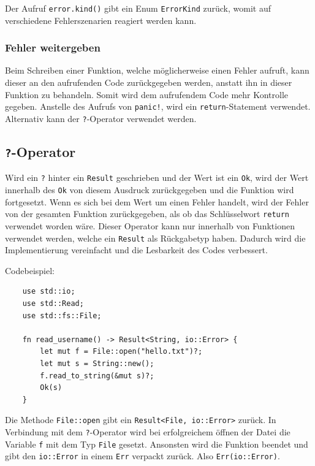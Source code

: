 Der Aufruf \verb"error.kind()" gibt ein Enum \verb"ErrorKind" zurück, womit auf verschiedene Fehlerszenarien reagiert werden kann.

\subsubsection{Fehler weitergeben}

Beim Schreiben einer Funktion, welche möglicherweise einen Fehler aufruft, kann dieser an den aufrufenden Code zurückgegeben werden, anstatt ihn in dieser Funktion zu behandeln. Somit wird dem aufrufendem Code mehr Kontrolle gegeben. Anstelle des Aufrufs von \verb"panic!", wird ein \verb"return"-Statement verwendet. Alternativ kann der \verb"?"-Operator verwendet werden.

\subsection{\texttt{?}-Operator}

Wird ein \verb"?" hinter ein \verb"Result" geschrieben und der Wert ist ein \verb"Ok", wird der Wert innerhalb des \verb"Ok" von diesem Ausdruck zurückgegeben und die Funktion wird fortgesetzt. Wenn es sich bei dem Wert um einen Fehler handelt, wird der Fehler von der gesamten Funktion zurückgegeben, als ob das Schlüsselwort \verb"return" verwendet worden wäre. Dieser Operator kann nur innerhalb von Funktionen verwendet werden, welche ein \verb"Result" als Rückgabetyp haben. Dadurch wird die Implementierung vereinfacht und die Lesbarkeit des Codes verbessert.

\newpage

Codebeispiel:

\begin{lstlisting}
    use std::io;
    use std::Read;
    use std::fs::File;

    fn read_username() -> Result<String, io::Error> {
        let mut f = File::open("hello.txt")?;
        let mut s = String::new();
        f.read_to_string(&mut s)?;
        Ok(s)
    }
\end{lstlisting}

Die Methode \verb"File::open" gibt ein \verb"Result<File, io::Error>" zurück. In Ver\-bin\-dung mit dem \verb"?"-Operator wird bei erfolgreichem öffnen der Datei die Variable \verb"f" mit  dem Typ \verb"File" gesetzt. Ansonsten wird die Funktion beendet und gibt den \verb"io::Error" in einem \verb"Err" verpackt zurück. Also \verb"Err(io::Error)".


